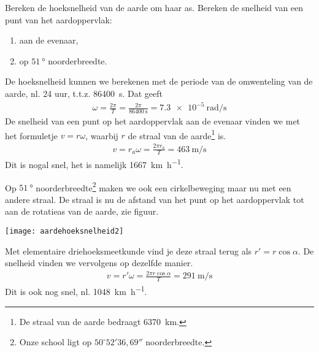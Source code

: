 \documentclass{ximera}
\begin{document}
\begin{exercise}
	Bereken de hoeksnelheid van de aarde om haar as. Bereken de snelheid van een punt van het aardoppervlak:
	\begin{enumerate}
		\item aan de evenaar,
		\item op $\SI{51}{\degree}$ noorderbreedte.
	\end{enumerate}
	\begin{oplossing}
		De hoeksnelheid kunnen we berekenen met de periode van de omwenteling van de aarde, nl. 24 uur, t.t.z. \SI{86400}{\second}. Dat geeft
		\begin{eqnarray*}
			\omega=\frac{2\pi}{T}=\frac{2\pi}{\SI{86400}{\second}}=\SI{7,3e-5}{\radian\per\second}
		\end{eqnarray*}
		De snelheid van een punt op het aardoppervlak aan de evenaar vinden we met het formuletje $v=r\omega$, waarbij $r$ de straal van de aarde\footnote{De straal van de aarde bedraagt \SI{6370}{\kilo\meter}.} is.
		\begin{eqnarray*}
		v=r_a\omega=\frac{2\pi r_a}{T}=\SI{463}{\meter\per\second}%
		\end{eqnarray*}
		Dit is nogal snel, het is namelijk \SI{1667}{\kilo\meter\per\hour}.%

		Op $\SI{51}{\degree}$ noorderbreedte\footnote{Onze school ligt op $50^\circ 52'36,\!69''$ noorderbreedte.} maken we ook een cirkelbeweging maar nu met een andere straal. De straal is nu de afstand van het punt op het aardoppervlak tot aan de rotatieas van de aarde, zie figuur. 
		\begin{image}
		\texttt{[image: aardehoeksnelheid2]}
		\end{image}
		Met elementaire driehoeksmeetkunde vind je deze straal terug als $r'=r\cos\alpha$. De snelheid vinden we vervolgens op dezelfde manier.
		\begin{eqnarray*}
		v=r'\omega=\frac{2\pi r\cos\alpha}{T}=\SI{291}{\meter\per\second}
		\end{eqnarray*}
		Dit is ook nog snel, nl. \SI{1048}{\kilo\meter\per\hour}.
	\end{oplossing}
\end{exercise}
\end{document}
